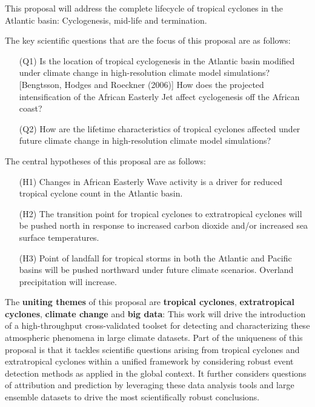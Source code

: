 \documentclass[11pt]{article}
\begin{document}
This proposal will address the complete lifecycle of tropical cyclones in the Atlantic basin:  Cyclogenesis, mid-life and termination.

The key scientific questions that are the focus of this proposal are as follows:
\begin{itemize}
\item[(Q1)] Is the location of tropical cyclogenesis in the Atlantic basin modified under climate change in high-resolution climate model simulations?  {\color{red}[Bengtsson, Hodges and Roeckner (2006)]}  How does the projected intensification of the African Easterly Jet affect cyclogenesis off the African coast?

\item[(Q2)] How are the lifetime characteristics of tropical cyclones affected under future climate change in high-resolution climate model simulations?
\end{itemize}

The central hypotheses of this proposal are as follows:

\vspace{-0.4cm}
\begin{itemize}
\item[(H1)] Changes in African Easterly Wave activity is a driver for reduced tropical cyclone count in the Atlantic basin.

\item[(H2)] The transition point for tropical cyclones to extratropical cyclones will be pushed north in response to increased carbon dioxide and/or increased sea surface temperatures.

\item[(H3)] Point of landfall for tropical storms in both the Atlantic and Pacific basins will be pushed northward under future climate scenarios.  Overland precipitation will increase.
\end{itemize}

The \textbf{uniting themes} of this proposal are \textbf{tropical cyclones}, \textbf{extratropical cyclones}, \textbf{climate change} and \textbf{big data}: This work will drive the introduction of a high-throughput cross-validated toolset for detecting and characterizing these atmospheric phenomena in large climate datasets.  Part of the uniqueness of this proposal is that it tackles scientific questions arising from tropical cyclones and extratropical cyclones within a unified framework by considering robust event detection methods as applied in the global context.  It further considers questions of attribution and prediction by leveraging these data analysis tools and large ensemble datasets to drive the most scientifically robust conclusions.
\end{document}

